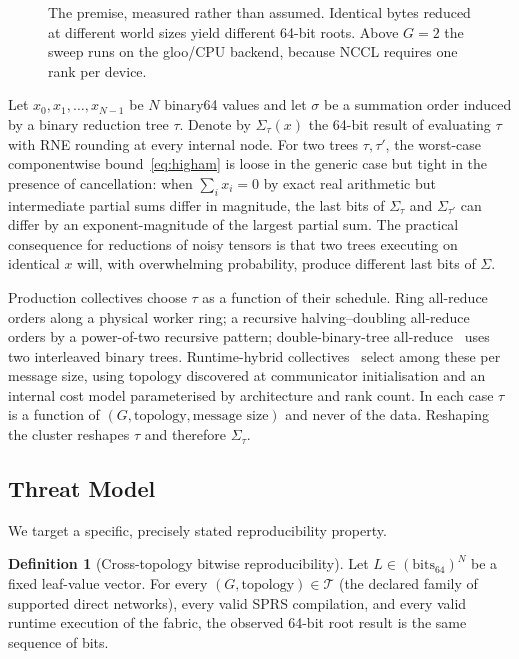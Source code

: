 \documentclass[journal,10pt]{IEEEtran}
\theoremstyle{plain}
\theoremstyle{definition}
\newtheorem{definition}{Definition}
\theoremstyle{remark}
\newcommand{\sprs}{\textsc{SPRS}}
\newcommand{\T}{\ensuremath{\mathcal{T}}}
\begin{document}
\begin{figure}[!t]\centering

\caption{The premise, measured rather than assumed. Identical bytes reduced at different world sizes yield different 64-bit roots. Above $G{=}2$ the sweep runs on the gloo/CPU backend, because NCCL requires one rank per device.}\label{fig:premise}
\end{figure}


Let $x_0, x_1, \ldots, x_{N-1}$ be $N$ binary64 values and let $\sigma$ be
a summation order induced by a binary reduction tree $\tau$. Denote by
$\Sigma_\tau(x)$ the 64-bit result of evaluating $\tau$ with RNE rounding
at every internal node. For two trees $\tau, \tau'$, the worst-case
componentwise bound~\eqref{eq:higham} is loose in the generic case but
tight in the presence of cancellation: when
$\sum_i x_i = 0$ by exact real arithmetic but intermediate partial sums
differ in magnitude, the last bits of $\Sigma_\tau$ and $\Sigma_{\tau'}$
can differ by an exponent-magnitude of the largest partial sum. The
practical consequence for reductions of noisy tensors is that two trees
executing on identical $x$ will, with overwhelming probability, produce
different last bits of $\Sigma$.

Production collectives choose $\tau$ as a function of their schedule.
Ring all-reduce~\cite{patarasuk2009bandwidth} orders along a physical
worker ring; a recursive halving--doubling all-reduce~\cite{rabenseifner2004optimization}
orders by a power-of-two recursive pattern; double-binary-tree
all-reduce~\cite{sanders2009two} uses two interleaved binary trees.
Runtime-hybrid collectives~\cite{nccl2018,rccl2019} select among these per
message size, using topology discovered at communicator initialisation and
an internal cost model parameterised by architecture and rank count. In each
case $\tau$ is a function of $(G, \text{topology}, \text{message size})$ and
never of the data. Reshaping the cluster reshapes $\tau$ and therefore
$\Sigma_\tau$.

\subsection{Threat Model}

We target a specific, precisely stated reproducibility property.

\begin{definition}[Cross-topology bitwise reproducibility]\label{def:ctbr}
Let $L \in (\mathrm{bits}_{64})^N$ be a fixed leaf-value vector. For every
$(G, \text{topology}) \in \T$ (the declared family of supported direct
networks), every valid \sprs{} compilation, and every valid runtime
execution of the fabric, the observed 64-bit root result is the same
sequence of bits.
\end{definition}
\end{document}
